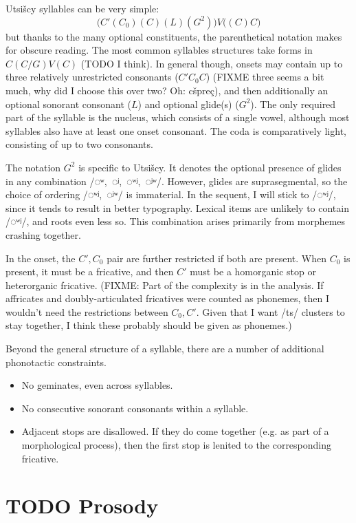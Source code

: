 \documentclass[12pt]{book} %
\begin{document}
Utsišcy syllables can be very simple:
$$\big( C'(C_0)(C)(L) (G^2) \big)V \big( (C)C \big)$$
but thanks to the many optional constituents, the parenthetical notation makes for obscure reading.
The most common syllables structures take forms in $C(C/G)V(C)$ (TODO I think).
In general though, onsets may contain up to three relatively unrestricted consonants ($C' C_0 C$) (FIXME three seems a bit much, why did I choose this over two? Oh: cšpreç), and then additionally an optional sonorant consonant ($L$) and optional glide(s) ($G^2$).
The only required part of the syllable is the nucleus, which consists of a single vowel, although most syllables also have at least one onset consonant.
The coda is comparatively light, consisting of up to two consonants.

The notation $G^2$ is specific to Utsišcy.
It denotes the optional presence of glides in any combination /◌ʷ,~◌ʲ,~◌ʷʲ,~◌ʲʷ/.
However, glides are suprasegmental, so the choice of ordering /◌ʷʲ,~◌ʲʷ/ is immaterial.
In the sequent, I will stick to /◌ʷʲ/, since it tends to result in better typography.
Lexical items are unlikely to contain /◌ʷʲ/, and roots even less so.
This combination arises primarily from morphemes crashing together.

In the onset, the $C', C_0$ pair are further restricted if both are present.
When $C_0$ is present, it must be a fricative, and then $C'$ must be a homorganic stop or heterorganic fricative.
(FIXME: Part of the complexity is in the analysis.
If affricates and doubly-articulated fricatives were counted as phonemes, then I wouldn't need the restrictions between $C_0, C'$.
Given that I want /ts/ clusters to stay together, I think these probably should be given as phonemes.)

Beyond the general structure of a syllable, there are a number of additional phonotactic constraints.
\begin{itemize}
\item No geminates, even across syllables.
\item No consecutive sonorant consonants within a syllable.
\item Adjacent stops are disallowed.
If they do come together (e.g. as part of a morphological process), then the first stop is lenited to the corresponding fricative.
\end{itemize}


\section{TODO Prosody}
\end{document}
